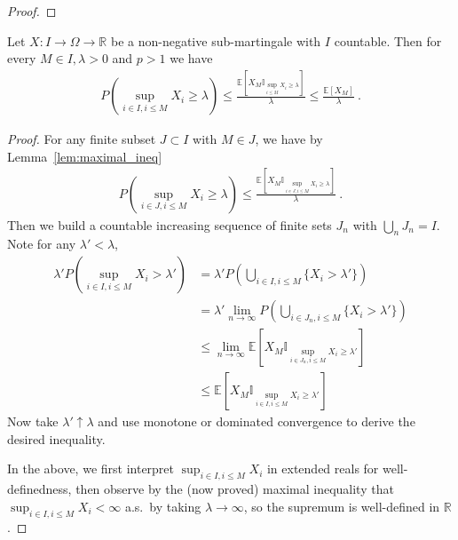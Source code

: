 \begin{proof}\leanok

\end{proof}


\begin{lemma}\label{lem:doob_countable}
  \leanok
  Let $X : I \rightarrow \Omega \rightarrow \mathbb{R}$ be a non-negative sub-martingale with $I$ countable.
  Then for every $M \in I,\lambda > 0$ and $p>1$ we have
  \begin{align*}
    P\left( \sup_{i\in I, i\leq M}X_i\geq\lambda \right)
    \le \frac{\mathbb{E}\left[X_M \mathbb{I}_{\sup_{i \le M}X_i \ge \lambda}\right]}{\lambda}
    \le \frac{\mathbb{E}[X_M]}{\lambda}
    \: .
  \end{align*}
\end{lemma}

\begin{proof}
  \leanok
For any finite subset $J \subset I$ with $M \in J$, we have by Lemma~\ref{lem:maximal_ineq}
\begin{align*}
  P\left( \sup_{i\in J, i \le M}X_i\geq\lambda \right)
  \le \frac{\mathbb{E}\left[X_{M} \mathbb{I}_{\sup_{i \in J, i \le M}X_i \ge \lambda}\right]}{\lambda}
  \: .
\end{align*}
Then we build a countable increasing sequence of finite sets $J_n$ with $\bigcup_nJ_n=I$.
Note for any $\lambda' < \lambda$,
\begin{align*}
  \lambda' P\left( \sup_{i\in I, i\leq M}X_i>\lambda' \right)
  &= \lambda' P\left( \bigcup_{i\in I, i\leq M}\{X_i>\lambda'\} \right) \\
  &= \lambda' \lim_{n\to\infty} P\left( \bigcup_{i\in J_n, i\leq M}\{X_i>\lambda'\} \right) \\
  &\le \lim_{n\to\infty} \mathbb{E}\left[X_{M} \mathbb{I}_{\sup_{i \in J_n, i \le M}X_i \ge \lambda'}\right] \\
  &\le \mathbb{E}\left[X_{M} \mathbb{I}_{\sup_{i \in I, i \le M}X_i \ge \lambda'}\right]
\end{align*}
Now take $\lambda'\uparrow\lambda$ and use monotone or dominated convergence to derive the desired inequality.

In the above, we first interpret $\sup_{i\in I, i\leq M}X_i$ in extended reals for well-definedness,
then observe by the (now proved) maximal inequality that $\sup_{i\in I, i\leq M}X_i < \infty$ a.s.\ by taking $\lambda\to\infty$,
so the supremum is well-defined in $\mathbb{R}$.
\end{proof}


